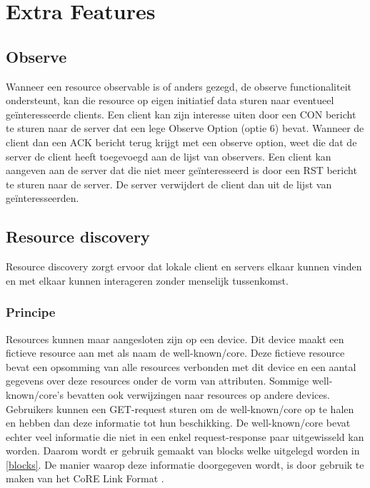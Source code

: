 \section{Extra Features}

\subsection{Observe} \label{observe}

Wanneer een resource observable is of anders gezegd, de observe functionaliteit ondersteunt, kan die resource op eigen initiatief data sturen naar eventueel ge\"{i}nteresseerde clients. Een client kan zijn interesse uiten door een CON bericht te sturen naar de server dat een lege Observe Option (optie 6) bevat. Wanneer de client dan een ACK bericht terug krijgt met een observe option, weet die dat de server de client heeft toegevoegd aan de lijst van observers. Een client kan aangeven aan de server dat die niet meer ge\"{i}nteresseerd is door een RST bericht te sturen naar de server. De server verwijdert de client dan uit de lijst van ge\"{i}nteresseerden.

\subsection{Resource discovery} \label{resourceDiscovery}
Resource discovery zorgt ervoor dat lokale client en servers elkaar kunnen vinden en met elkaar kunnen interageren zonder menselijk tussenkomst.

\subsubsection{Principe}
\noindent
Resources kunnen maar aangesloten zijn op een device. Dit device maakt een fictieve resource aan met als naam de well-known/core. Deze fictieve resource bevat een opsomming van alle resources verbonden met dit device en een aantal gegevens over deze resources onder de vorm van attributen. Sommige well-known/core's bevatten ook verwijzingen naar resources op andere devices. Gebruikers kunnen een GET-request sturen om de well-known/core op te halen en hebben dan deze informatie tot hun beschikking. De well-known/core bevat echter veel informatie die niet in een enkel request-response paar uitgewisseld kan worden. Daarom wordt er gebruik gemaakt van blocks welke uitgelegd worden in \ref{blocks}. De manier waarop deze informatie doorgegeven wordt, is door gebruik te maken van het CoRE Link Format \cite{coapDiscovery}.

